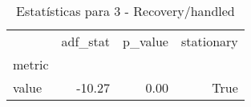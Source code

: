 \begin{table}[htbp]
\caption{Estatísticas para 3 - Recovery/handled}
\label{tab:3_-_recovery_handled_adf_test}
\begin{tabular}{lrrr}
\toprule
 & adf_stat & p_value & stationary \\
metric &  &  &  \\
\midrule
value & -10.27 & 0.00 & True \\
\bottomrule
\end{tabular}
\end{table}
